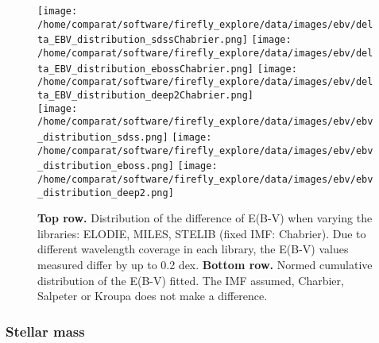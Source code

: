 \documentclass[onecolumn]{aa}
\begin{document}
\begin{figure}
\begin{center}
\caption{\label{fig:distributions:EBV} 
\textbf{Top row.} 
Distribution of the difference of E(B-V) when varying the libraries: ELODIE, MILES, STELIB (fixed IMF: Chabrier).
Due to different wavelength coverage in each library, the E(B-V) values measured differ by up to 0.2 dex.
\textbf{Bottom row.} 
Normed cumulative distribution of the E(B-V) fitted. The IMF assumed, Charbier, Salpeter or Kroupa does not make a difference. 
}  
\texttt{[image: /home/comparat/software/firefly\_explore/data/images/ebv/delta\_EBV\_distribution\_sdssChabrier.png]}
\hspace*{-0.6cm}
\texttt{[image: /home/comparat/software/firefly\_explore/data/images/ebv/delta\_EBV\_distribution\_ebossChabrier.png]}
\hspace*{-0.6cm}
\texttt{[image: /home/comparat/software/firefly\_explore/data/images/ebv/delta\_EBV\_distribution\_deep2Chabrier.png]}\\
\texttt{[image: /home/comparat/software/firefly\_explore/data/images/ebv/ebv\_distribution\_sdss.png]}
\hspace*{-0.6cm}
\texttt{[image: /home/comparat/software/firefly\_explore/data/images/ebv/ebv\_distribution\_eboss.png]}          
\hspace*{-0.6cm}
\texttt{[image: /home/comparat/software/firefly\_explore/data/images/ebv/ebv\_distribution\_deep2.png]} 
\end{center}
\end{figure}


\subsubsection{Stellar mass}
\label{subsec:mass}
\end{document}
